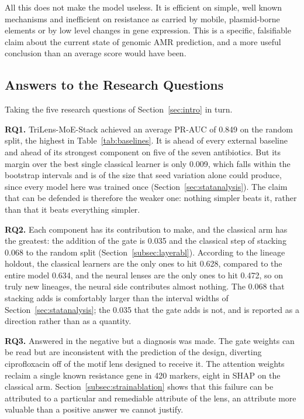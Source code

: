\documentclass[journal]{IEEEtran}
\begin{document}
All this does not make the model useless. It is efficient on simple, well known
mechanisms and inefficient on resistance as carried by mobile, plasmid-borne elements
or by low level changes in gene expression. This is a specific, falsifiable claim
about the current state of genomic AMR prediction, and a more useful conclusion than
an average score would have been.

\subsection{Answers to the Research Questions}

Taking the five research questions of Section~\ref{sec:intro} in turn.

\textbf{RQ1.} TriLens-MoE-Stack achieved an average PR-AUC of 0.849 on the random
split, the highest in Table~\ref{tab:baselines}. It is ahead of every external
baseline and ahead of its strongest component on five of the seven antibiotics. But
its margin over the best single classical learner is only 0.009, which falls within
the bootstrap intervals and is of the size that seed variation alone could produce,
since every model here was trained once (Section~\ref{sec:statanalysis}). The claim
that can be defended is therefore the weaker one: nothing simpler beats it, rather
than that it beats everything simpler.

\textbf{RQ2.} Each component has its contribution to make, and the classical arm has
the greatest: the addition of the gate is 0.035 and the classical step of stacking
0.068 to the random split (Section~\ref{subsec:layerabl}). According to the lineage
holdout, the classical learners are the only ones to hit 0.628, compared to the entire
model 0.634, and the neural lenses are the only ones to hit 0.472, so on truly new
lineages, the neural side contributes almost nothing. The 0.068 that stacking adds is
comfortably larger than the interval widths of Section~\ref{sec:statanalysis}; the
0.035 that the gate adds is not, and is reported as a direction rather than as a
quantity.

\textbf{RQ3.} Answered in the negative but a diagnosis was made. The gate weights can
be read but are inconsistent with the prediction of the design, diverting
ciprofloxacin off of the motif lens designed to receive it. The attention weights
reclaim a single known resistance gene in 420 markers, eight in SHAP on the classical
arm. Section~\ref{subsec:strainablation} shows that this failure can be attributed
to a particular and remediable attribute of the lens, an attribute more valuable
than a positive answer we cannot justify.
\end{document}
